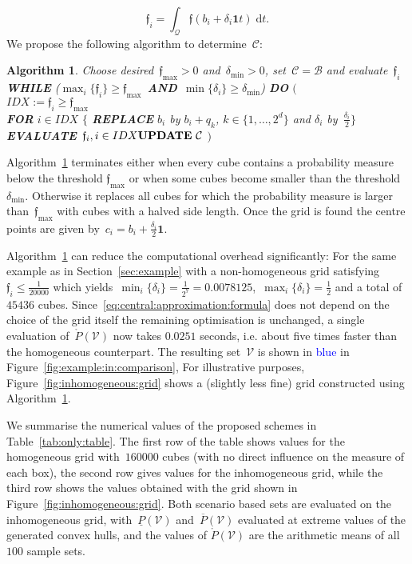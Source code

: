 \documentclass[letterpaper, 10pt, conference]{ieeeconf} %
\newtheorem{algo}[thm]{Algorithm}
\providecommand{\bfa}[1]{\mathbf{#1}}
\begin{document}
\[
\mathfrak{f}_i=\int_{\mathcal Q}\mathfrak{f}(b_i+\delta_i\bfa{1} t) \; \mathrm d t.
\]
%
We propose the following algorithm to determine~$\mathcal C$:
%
\begin{algo}\label{algo:non:homo:cubes}
Choose desired~$\mathfrak{f}_{\max}>0$ and~$\delta_{\min}>0$, set~$\mathcal C=\mathcal B$ and evaluate~$\mathfrak{f}_i$\\
\textbf{WHILE} ($\max_i\{\mathfrak{f}_i\}\geq\mathfrak{f}_{\max}$~\textbf{AND}~$\min\{\delta_i\}\geq\delta_{\min}$) \textbf{DO} $\bigl($\\
$IDX := \mathfrak{f}_i\geq \mathfrak{f}_{\max}$\\
\textbf{FOR} $i\in IDX$ $\{$ \textbf{REPLACE} $b_i$ by $b_i+q_k$, $k\in\{1,\dots,2^d\}$ 
and $\delta_i$ by~$\frac{\delta_i}{2}\}$\\
\textbf{EVALUATE}~$\mathfrak f_i, i\in IDX\\
\textbf{UPDATE}~\mathcal C$
$\bigr)$
\end{algo}
%
Algorithm~\ref{algo:non:homo:cubes} terminates either when every cube contains a probability measure below the threshold $\mathfrak{f}_{\max}$ or when some cubes become smaller than the threshold $\delta_{\min}$. Otherwise it replaces all cubes for which the probability measure is larger than~$\mathfrak{f}_{\max}$ with cubes with a halved side length.
%
Once the grid is found the centre points are given by~$c_i=b_i+\frac{\delta_i}{2}\bfa{1}$.
%


%
Algorithm~\ref{algo:non:homo:cubes} can reduce the computational overhead significantly:
%
For the same example as in Section~\ref{sec:example} with a non-homogeneous grid satisfying~$\mathfrak{f}_i\leq\frac{1}{20000}$ which yields~$\min_i\{\delta_i\}=\frac{1}{2^7}=0.0078125$,~$\max_i\{\delta_i\}=\frac{1}{2}$ and a total of~$45436$ cubes.
%
Since~\eqref{eq:central:approximation:formula} does not depend on the choice of the grid itself the remaining optimisation is unchanged, a single evaluation of~$\mathring{P}(\mathcal V)$ now takes $0.0251$ seconds,
i.e. about five times  faster than the homogeneous counterpart. The resulting set~$\mathcal V$ is shown in \textcolor{blue}{blue} in Figure~\ref{fig:example:in:comparison},
%
For illustrative purposes, Figure~\ref{fig:inhomogeneous:grid} shows a (slightly less fine) grid constructed using Algorithm~\ref{algo:non:homo:cubes}.

%
We summarise the numerical values of the proposed schemes in Table~\ref{tab:only:table}.
%
The first row of the table shows values for the homogeneous grid with~$160000$ cubes (with no direct influence on the measure of each box), the second row gives values for the inhomogeneous grid, while the third row shows the values obtained with the grid shown in Figure~\ref{fig:inhomogeneous:grid}. 
%
Both scenario based sets are evaluated on the inhomogeneous grid, with~$\underline{P}(\mathcal V)$ and~$\overline{P}(\mathcal V)$ evaluated at extreme values of the generated convex hulls, and the values of $\mathring{P}(\mathcal V)$ are the  arithmetic means of all $100$ sample sets.
%
\end{document}
